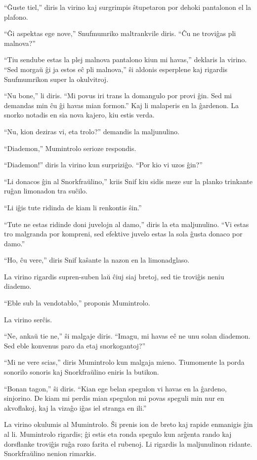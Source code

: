 ``Ĝuste tiel,'' diris la virino kaj surgrimpis ŝtupetaron por dehoki pantalonon el la plafono.

``Ĝi aspektas ege nove,'' Snufmumriko maltrankvile diris. ``Ĉu ne troviĝas pli malnova?''

``Tiu sendube estas la plej malnova pantalono kiun mi havas,'' deklaris la virino. ``Sed morgaŭ ĝi ja estos eĉ pli malnova,'' ŝi aldonis esperplene kaj rigardis Snufmumrikon super la okulvitroj.

``Nu bone,'' li diris. ``Mi povus iri trans la domangulo por provi ĝin. Sed mi demandas min ĉu ĝi havas mian formon.'' Kaj li malaperis en la ĝardenon.
\sectionbreak
La snorko notadis en sia nova kajero, kiu estis verda.

``Nu, kion deziras vi, eta trolo?'' demandis la maljunulino.

``Diademon,'' Mumintrolo serioze respondis.

``Diademon!'' diris la virino kun surpriziĝo. ``Por kio vi uzos ĝin?''

``Li donacos ĝin al Snorkfraŭlino,'' kriis Snif kiu sidis meze sur la planko trinkante ruĝan limonadon tra suĉilo.

``Li iĝis tute ridinda de kiam li renkontis ŝin.''

``Tute ne estas ridinde doni juvelojn al damo,'' diris la eta maljunulino. ``Vi estas tro malgranda por kompreni, sed efektive juvelo estas la sola ĝusta donaco por damo.''

``Ho, ĉu vere,'' diris Snif kaŝante la nazon en la limonadglaso.

La virino rigardis supren-suben laŭ ĉiuj siaj bretoj, sed tie troviĝis neniu diademo.

``Eble sub la vendotablo,'' proponis Mumintrolo.

La virino serĉis.

``Ne, ankaŭ tie ne,'' ŝi malgaje diris. ``Imagu, mi havas eĉ ne unu solan diademon. Sed eble konvenus paro da etaj snorkogantoj?''

``Mi ne vere scias,'' diris Mumintrolo kun malgaja mieno. Tiumomente la porda sonorilo sonoris kaj Snorkfraŭlino eniris la butikon.

``Bonan tagon,'' ŝi diris. ``Kian ege belan spegulon vi havas en la ĝardeno, sinjorino. De kiam mi perdis mian spegulon mi povas speguli min nur en akvoflakoj, kaj la vizaĝo iĝas iel stranga en ili.''

La virino okulumis al Mumintrolo. Ŝi prenis ion de breto kaj rapide enmanigis ĝin al li. Mumintrolo rigardis; ĝi estis eta ronda spegulo kun arĝenta rando kaj dorsflanke troviĝis ruĝa rozo farita el rubenoj. Li rigardis la maljunulinon ridante. Snorkfraŭlino nenion rimarkis.

